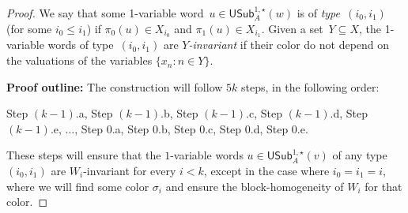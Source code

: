 \documentclass{article}
\numberwithin{theorem}{section}
\newcommand{\USub}{\mathsf{USub}}
\begin{document}
\begin{proof}
We say that some 1-variable word~$u \in \USub^{1,\star}_A(w)$ is of \emph{type~$(i_0,i_1)$} (for some $i_0 \leq i_1$) if $\pi_0(u) \in X_{i_0}$ and $\pi_1(u) \in X_{i_1}$. Given a set~$Y \subseteq X$, the 1-variable words of type~$(i_0,i_1)$ are \emph{$Y$-invariant} if their color do not depend on the valuations of the variables $\{x_n : n \in Y\}$.
\smallskip

\noindent
\textbf{Proof outline:}
The construction will follow $5k$ steps, in the following order:
\begin{center}
Step $(k-1)$.a, Step $(k-1)$.b, Step $(k-1)$.c, Step $(k-1)$.d, Step $(k-1)$.e, $\dots$, Step 0.a, Step 0.b, Step 0.c, Step 0.d, Step 0.e.
\end{center}
These steps will ensure that the $1$-variable words $u \in \USub_A^{1,\star}(v)$ of any type $(i_0,i_1)$ are $W_i$-invariant for every $i < k$, except in the case where $i_0 = i_1 = i$, where we will find some color $\sigma_i$ and ensure the block-homogeneity of $W_i$ for that color.
\smallskip


\end{proof}
\end{document}
